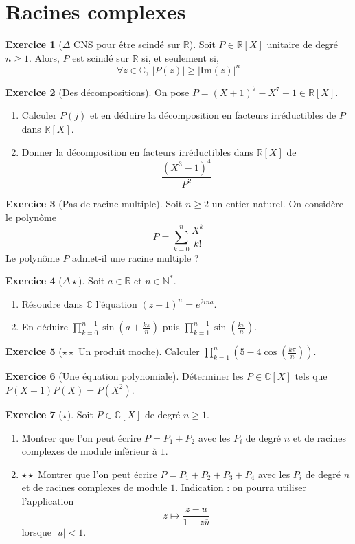 \documentclass[french]{book}
\newcommand{\N}{\mathbb{N}}
\newcommand{\R}{\mathbb{R}}
\newcommand{\C}{\mathbb{C}}
\newcommand{\st}{^*}
\newcommand{\im}{\text{Im}}
\theoremstyle{definition}
\newtheorem{ex}{Exercice}[chapter]
\theoremstyle{theorem}
\theoremstyle{remark}
\begin{document}
\section{Racines complexes}

\begin{ex}[$\Delta$ CNS pour être scindé sur $\R$]
	Soit $P\in\R[X]$ unitaire de degré $n\geqslant1$. Alors, $P$ est scindé sur $\R$ si, et seulement si, $$\forall z\in\C,\ \lvert P(z)\rvert\geqslant\lvert\im(z)\rvert^n$$
\end{ex}

\begin{ex}[Des décompositions]
	On pose $P=(X+1)^7-X^7-1\in\R[X]$.
	\begin{enumerate}
		\item Calculer $P(j)$ et en déduire la décomposition en facteurs irréductibles de $P$ dans $\R[X]$.
		\item Donner la décomposition en facteurs irréductibles dans $\R[X]$ de $$\frac{(X^3-1)^4}{P^2}$$
	\end{enumerate}
\end{ex}

\begin{ex}[Pas de racine multiple]
	Soit $n \ge 2$ un entier naturel. On considère le polynôme $$P = \sum_{k=0}^{n}\frac{X^k}{k!}$$ Le polynôme $P$ admet-il une racine multiple ?
\end{ex}

\begin{ex}[$\Delta\star$]
	Soit $a\in\R$ et $n\in\N\st$.
	\begin{enumerate}
		\item Résoudre dans $\C$ l'équation $(z+1)^n=e^{2ina}$.
		\item En déduire $\displaystyle\prod_{k=0}^{n-1}\sin\left(a+\frac{k\pi}{n}\right)$ puis $\displaystyle\prod_{k=1}^{n-1}\sin\left(\frac{k\pi}{n}\right)$.
	\end{enumerate}
\end{ex}

\begin{ex}[$\star\star$ Un produit moche]
	Calculer $\displaystyle\prod_{k=1}^{n}\left(5-4\cos\left(\frac{k\pi}{n}\right)\right)$.
\end{ex}

\begin{ex}[Une équation polynomiale]
	Déterminer les $P\in\C[X]$ tels que $P(X+1)P(X)=P(X^2)$.
\end{ex}

\begin{ex}[$\star$]
	Soit $P\in\C[X]$ de degré $n\geqslant 1$.
	\begin{enumerate}
		\item Montrer que l'on peut écrire $P=P_1+P_2$ avec les $P_i$ de degré $n$ et de racines complexes de module inférieur à $1$.
		\item $\star\star$ Montrer que l'on peut écrire $P=P_1+P_2+P_3+P_4$ avec les $P_i$ de degré $n$ et de racines complexes de module $1$. Indication : on pourra utiliser l'application $$z\mapsto\frac{z-u}{1-z\overline{u}}$$ lorsque $\lvert u\rvert <1$.
	\end{enumerate}
\end{ex}
\end{document}
